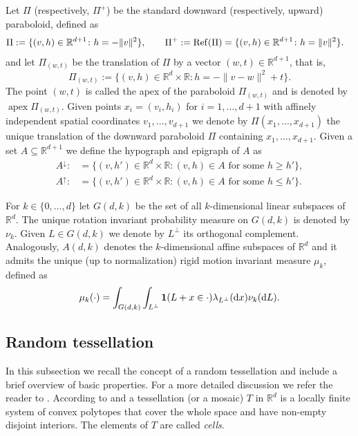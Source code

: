 \documentclass[11pt,a4paper]{article}
\theoremstyle{plain}
\theoremstyle{definition}
\theoremstyle{remark}
\def\RR{\mathbb{R}}
\newcommand{\dd}{{\rm d}}
\newcommand{\apex}{\mathop{\mathrm{apex}}\nolimits}
\begin{document}
Let $\Pi$ (respectively, $\Pi^+$) be the standard downward  (respectively, upward) paraboloid, defined as
\begin{align*}
    \Pi&:=\{(v,h)\in\RR^{d+1}\colon h=-\|v\|^2\},\qquad \Pi^+:={\rm Ref}(\Pi)=\{(v,h)\in\RR^{d+1}\colon h=\|v\|^2\}.
\end{align*}
and let $\Pi_{(w,t)}$ be the translation of $\Pi$ by a vector $(w,t)\in\RR^{d+1}$, that is,
\[
    \Pi_{(w,t)}:=\{(v,h)\in\RR^{d}\times\RR\colon h=-\|v-w\|^2+t\}.
\]
The point $(w,t)$ is called the apex of the paraboloid $\Pi_{(w,t)}$ and is denoted by $\apex\Pi_{(w,t)}$. Given points $x_i=(v_i,h_i)$ for $i =1,\dots, d+1$ with affinely independent spatial coordinates $v_1,\ldots,v_{d+1}$ we denote by $\Pi(x_1,\dots,x_{d+1})$ the unique translation of the downward paraboloid $\Pi$ containing $x_1,\dots,x_{d+1}$. Given a set $A\subseteq \RR^{d+1}$ we define the hypograph and epigraph of $A$ as
\begin{align*}
    A^{\downarrow}:&=\{(v,h')\in\RR^{d}\times\RR\colon (v,h) \in A \text{ for some } h\ge h'\},\\
    A^{\uparrow}:&=\{(v,h')\in\RR^{d}\times\RR\colon (v,h) \in A \text{ for some } h\leq h'\}.
\end{align*}

For $k \in \{0,\ldots,d\}$ let $G(d,k)$ be the set of all $k$-dimensional linear subspaces of $\RR^d$. The unique rotation invariant probability measure on $G(d,k)$ is denoted by $\nu_k$. Given $L\in G(d,k)$ we denote by $L^{\perp}$ its orthogonal complement. Analogously, $A(d,k)$ denotes the $k$-dimensional affine subspaces of $\RR^d$ and it admits the unique (up to normalization) rigid motion invariant measure $\mu_k$, defined as
\[
    \mu_k(\cdot)=\int_{G(d,k)}\int_{L^\bot}{\bf 1}(L+x\in \cdot)\lambda_{L^\bot}(\dd x) \nu_k(\dd L).
\]

\subsection{Random tessellation}\label{sec:Rtessel}

In this subsection we recall the concept of a random tessellation and include a brief overview of basic properties. For a more detailed discussion we refer the reader to \cite[Chapter 10]{SW}. According to \cite[Definition 10.1.1]{SW} and \cite[Lemma~10.1.1]{SW} a tessellation (or a mosaic) $T$ in $\RR^d$ is a locally finite system of convex polytopes that cover the whole space and have non-empty disjoint interiors. The elements of $T$ are called {\textit{cells}}. 
\end{document}
